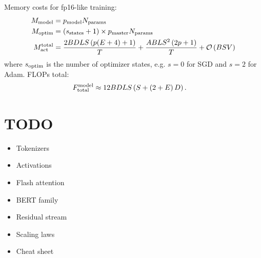 \documentclass[11pt]{article}
\begin{document}
Memory costs for fp16-like training:
\begin{align}
    M _{ {\rm model} } &=p _{ {\rm model} } N _{ {\rm params} } \nonumber\\
    M _{ {\rm optim} }  &=  \left ( s _{ {\rm states} }+1 \right) \times p _{ {\rm master } } N _{ {\rm params} } \nonumber\\
    M _{ {\rm act}  } ^{ {\rm  total}  } & =\frac{ 2BDLS   \left ( p(E+4) + 1   \right ) }{ T }
    + \frac{ ABLS ^{ 2 } \left ( 2p+1\right ) }{ T }  + \mathcal{O} \left( BSV \right)
\end{align}
where $ s _{ {\rm  optim} } $ is the number of optimizer states, e.g. $ s=0 $ for SGD and $ s=2 $
for Adam. FLOPs total:
\begin{align}
    F _{ {\rm total}  } ^{ {\rm  model}  } &\approx 12 BDLS \left ( S + \left ( 2+E \right )D \right ) .
\end{align}


 \section{TODO}

 \begin{itemize}
 \item Tokenizers
 \item Activations
 \item Flash attention
 \item BERT family
 \item Residual stream
 \item Scaling laws
 \item Cheat sheet
 \end{itemize}



\end{document}
